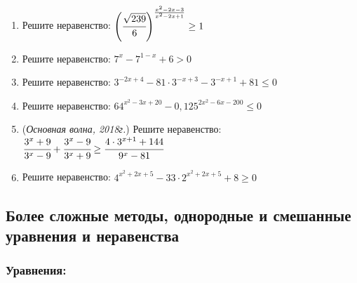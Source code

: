 \documentclass[12pt]{article}
\begin{document}
\begin{enumerate}[start=1,label={\itshape\bfseries \arabic*.}]

\item Решите неравенство: $\left(\cfrac{\sqrt{239}}{6}\right)^{\frac{x^2 - 2x - 3}{x^2 - 2x + 1}} \ge 1$

\item Решите неравенство: $7^x - 7^{1 - x} + 6 > 0$

\item Решите неравенство: $3^{-2x + 4} - 81 \cdot 3^{-x + 3} - 3^{-x + 1} + 81 \le 0$

\item Решите неравенство: $64^{x^2 - 3x + 20} - 0,125^{2x^2 - 6x - 200} \le 0$

\item (\textit{Основная волна, 2018г.}) Решите неравенство: $\cfrac{3^x + 9}{3^x - 9}  + \cfrac{3^x - 9}{3^x + 9} \ge \cfrac{4 \cdot 3^{x + 1} + 144}{9^x - 81}$

\item Решите неравенство: $4^{x^2 + 2x + 5} - 33 \cdot 2^{x^2 + 2x + 5} + 8 \ge 0$

\end{enumerate}






\subsection{Более сложные методы, однородные и смешанные уравнения и неравенства}

\subsubsection*{Уравнения:}
\end{document}

